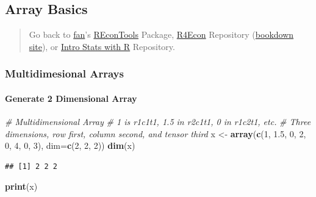 \documentclass[
]{book}
\newenvironment{Shaded}{\begin{snugshade}}{\end{snugshade}}
\newcommand{\CommentTok}[1]{\textcolor[rgb]{0.56,0.35,0.01}{\textit{#1}}}
\newcommand{\DataTypeTok}[1]{\textcolor[rgb]{0.13,0.29,0.53}{#1}}
\newcommand{\DecValTok}[1]{\textcolor[rgb]{0.00,0.00,0.81}{#1}}
\newcommand{\FloatTok}[1]{\textcolor[rgb]{0.00,0.00,0.81}{#1}}
\newcommand{\KeywordTok}[1]{\textcolor[rgb]{0.13,0.29,0.53}{\textbf{#1}}}
\newcommand{\NormalTok}[1]{#1}
\newcommand{\StringTok}[1]{\textcolor[rgb]{0.31,0.60,0.02}{#1}}
\begin{document}
\hypertarget{array-basics}{%
\subsection{Array Basics}\label{array-basics}}

\begin{quote}
Go back to \href{http://fanwangecon.github.io/}{fan}'s \href{https://fanwangecon.github.io/REconTools/}{REconTools} Package, \href{https://fanwangecon.github.io/R4Econ/}{R4Econ} Repository (\href{https://fanwangecon.github.io/R4Econ/bookdown}{bookdown site}), or \href{https://fanwangecon.github.io/Stat4Econ/}{Intro Stats with R} Repository.
\end{quote}

\hypertarget{multidimesional-arrays}{%
\subsubsection{Multidimesional Arrays}\label{multidimesional-arrays}}

\hypertarget{generate-2-dimensional-array}{%
\paragraph{Generate 2 Dimensional Array}\label{generate-2-dimensional-array}}

\begin{Shaded}
\begin{Highlighting}[]
\CommentTok{# Multidimensional Array}
\CommentTok{# 1 is r1c1t1, 1.5 in r2c1t1, 0 in r1c2t1, etc.}
\CommentTok{# Three dimensions, row first, column second, and tensor third}
\NormalTok{x <-}\StringTok{ }\KeywordTok{array}\NormalTok{(}\KeywordTok{c}\NormalTok{(}\DecValTok{1}\NormalTok{, }\FloatTok{1.5}\NormalTok{, }\DecValTok{0}\NormalTok{, }\DecValTok{2}\NormalTok{, }\DecValTok{0}\NormalTok{, }\DecValTok{4}\NormalTok{, }\DecValTok{0}\NormalTok{, }\DecValTok{3}\NormalTok{), }\DataTypeTok{dim=}\KeywordTok{c}\NormalTok{(}\DecValTok{2}\NormalTok{, }\DecValTok{2}\NormalTok{, }\DecValTok{2}\NormalTok{))}
\KeywordTok{dim}\NormalTok{(x)}
\end{Highlighting}
\end{Shaded}

\begin{verbatim}
## [1] 2 2 2
\end{verbatim}

\begin{Shaded}
\begin{Highlighting}[]
\KeywordTok{print}\NormalTok{(x)}
\end{Highlighting}
\end{Shaded}
\end{document}
